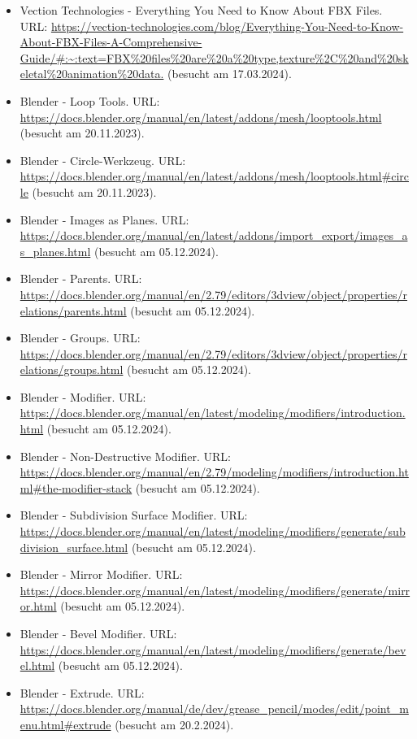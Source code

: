 \begin{itemize}[leftmargin=0pt]
    \item Vection Technologies - Everything You Need to Know About FBX Files. {\scriptsize URL:} \url{https://vection-technologies.com/blog/Everything-You-Need-to-Know-About-FBX-Files-A-Comprehensive-Guide/#:~:text=FBX%20files%20are%20a%20type,texture%2C%20and%20skeletal%20animation%20data.} (besucht am 17.03.2024).
    \item Blender - Loop Tools. {\scriptsize URL:} \url{https://docs.blender.org/manual/en/latest/addons/mesh/looptools.html} (besucht am 20.11.2023).
    \item Blender - Circle-Werkzeug. {\scriptsize URL:} \url{https://docs.blender.org/manual/en/latest/addons/mesh/looptools.html#circle} (besucht am 20.11.2023).
    \item Blender - Images as Planes. {\scriptsize URL:} \url{https://docs.blender.org/manual/en/latest/addons/import_export/images_as_planes.html} (besucht am 05.12.2024).
    \item Blender - Parents. {\scriptsize URL:} \url{https://docs.blender.org/manual/en/2.79/editors/3dview/object/properties/relations/parents.html} (besucht am 05.12.2024).
    \item Blender - Groups. {\scriptsize URL:} \url{https://docs.blender.org/manual/en/2.79/editors/3dview/object/properties/relations/groups.html} (besucht am 05.12.2024).
    \item Blender - Modifier. {\scriptsize URL:} \url{https://docs.blender.org/manual/en/latest/modeling/modifiers/introduction.html} (besucht am 05.12.2024).
    \item Blender - Non-Destructive Modifier. {\scriptsize URL:} \url{https://docs.blender.org/manual/en/2.79/modeling/modifiers/introduction.html#the-modifier-stack} (besucht am 05.12.2024).
    \item Blender - Subdivision Surface Modifier. {\scriptsize URL:} \url{https://docs.blender.org/manual/en/latest/modeling/modifiers/generate/subdivision_surface.html} (besucht am 05.12.2024).
    \item Blender - Mirror Modifier. {\scriptsize URL:} \url{https://docs.blender.org/manual/en/latest/modeling/modifiers/generate/mirror.html} (besucht am 05.12.2024).
    \item Blender - Bevel Modifier. {\scriptsize URL:} \url{https://docs.blender.org/manual/en/latest/modeling/modifiers/generate/bevel.html} (besucht am 05.12.2024).
    \item Blender - Extrude. {\scriptsize URL:} \url{https://docs.blender.org/manual/de/dev/grease_pencil/modes/edit/point_menu.html#extrude} (besucht am 20.2.2024).

\end{itemize}
